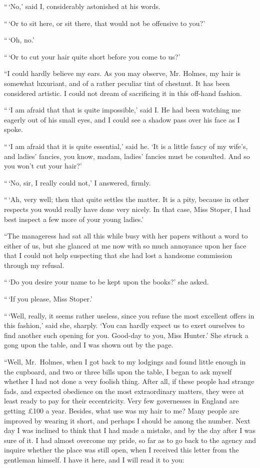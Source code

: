 “\,‘No,’ said I, considerably astonished at his words.

“\,‘Or to sit here, or sit there, that would not be offensive
to you?’

“\,‘Oh, no.’

“\,‘Or to cut your hair quite short before you come to us?’

“I could hardly believe my ears. As you may observe, Mr.
Holmes, my hair is somewhat luxuriant, and of a rather peculiar
tint of chestnut. It has been considered artistic. I could
not dream of sacrificing it in this off-hand fashion.

“\,‘I am afraid that that is quite impossible,’ said I. He
had been watching me eagerly out of his small eyes, and I
could see a shadow pass over his face as I spoke.

“\,‘I am afraid that it is quite essential,’ said he. ‘It is a
little fancy of my wife’s, and ladies’ fancies, you know, madam,
ladies’ fancies must be consulted. And so you won’t cut your
hair?’

“\,‘No, sir, I really could not,’ I answered, firmly.

“\,‘Ah, very well; then that quite settles the matter. It is
a pity, because in other respects you would really have done
very nicely. In that case, Miss Stoper, I had best inspect a
few more of your young ladies.’

“The manageress had sat all this while busy with her
papers without a word to either of us, but she glanced at me
now with so much annoyance upon her face that I could not
help suspecting that she had lost a handsome commission
through my refusal.

“\,‘Do you desire your name to be kept upon the books?’
she asked.

“\,‘If you please, Miss Stoper.’

“\,‘Well, really, it seems rather useless, since you refuse the
most excellent offers in this fashion,’ said she, sharply. ‘You
can hardly expect us to exert ourselves to find another such
opening for you. Good-day to you, Miss Hunter.’ She struck
a gong upon the table, and I was shown out by the page.

“Well, Mr.~Holmes, when I got back to my lodgings and
found little enough in the cupboard, and two or three bills
upon the table, I began to ask myself whether I had not done
a very foolish thing. After all, if these people had strange
fads, and expected obedience on the most extraordinary matters,
they were at least ready to pay for their eccentricity.
Very few governesses in England are getting £100 a year.
Besides, what use was my hair to me? Many people are improved
by wearing it short, and perhaps I should be among
the number. Next day I was inclined to think that I had
made a mistake, and by the day after I was sure of it. I had
almost overcome my pride, so far as to go back to the agency
and inquire whether the place was still open, when I received
this letter from the gentleman himself. I have it here, and I
will read it to you:


